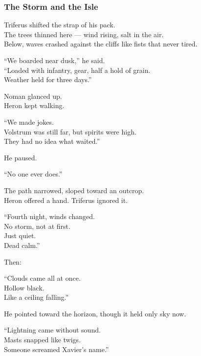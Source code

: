 \documentclass[12pt]{article}
\begin{document}
\dotfill

\subsubsection{The Storm and the Isle}

Triferus shifted the strap of his pack.\\
The trees thinned here — wind rising, salt in the air.\\
Below, waves crashed against the cliffs like fists that never tired.

“We boarded near dusk,” he said.\\
“Loaded with infantry, gear, half a hold of grain.\\
Weather held for three days.”

\vspace{1em}

Noman glanced up.\\
Heron kept walking.

“We made jokes.\\
Volstrum was still far, but spirits were high.\\
They had no idea what waited.”

He paused.

“No one ever does.”

\vspace{1em}

The path narrowed, sloped toward an outcrop.\\
Heron offered a hand. Triferus ignored it.

“Fourth night, winds changed.\\
No storm, not at first.\\
Just quiet.\\
Dead calm.”

\vspace{1em}

Then:

“Clouds came all at once.\\
Hollow black.\\
Like a ceiling falling.”

He pointed toward the horizon, though it held only sky now.

“Lightning came without sound.\\
Masts snapped like twigs.\\
Someone screamed Xavier’s name.”

\vspace{1em}
\end{document}
